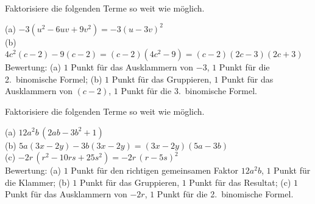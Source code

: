 \documentclass[11pt]{exam}
\begin{document}
\begin{questions}
\noaddpoints
\question[\totalpoints]
\addpoints
Faktorisiere die folgenden Terme so weit wie möglich.
{\begin{solution}
	(a) $-3(u^2-6uv+9v^2)=-3(u-3v)^2$\\
	(b) $4c^2(c-2)-9(c-2)=(c-2)(4c^2-9)=(c-2)(2c-3)(2c+3)$\\
	Bewertung: (a) $1$ Punkt für das Ausklammern von $-3$, $1$ Punkt für die 2.\ binomische Formel; (b) $1$ Punkt für das Gruppieren, $1$ Punkt für das Ausklammern von $(c-2)$, $1$ Punkt für die 3.\ binomische Formel.
\end{solution}}
{}


\noaddpoints
\question[\totalpoints] %
\addpoints
Faktorisiere die folgenden Terme so weit wie möglich.
{\begin{solution}
	(a) $12a^2b\,(2ab-3b^2+1)$\\
	(b) $5a(3x-2y)-3b(3x-2y)=(3x-2y)(5a-3b)$\\
	(c) $-2r\,(r^2-10rs+25s^2)=-2r\,(r-5s)^2$\\
	Bewertung: (a) $1$ Punkt für den richtigen gemeinsamen Faktor $12a^2b$, $1$ Punkt für die Klammer; (b) $1$ Punkt für das Gruppieren, $1$ Punkt für das Resultat; (c) $1$ Punkt für das Ausklammern von $-2r$, $1$ Punkt für die 2.\ binomische Formel.
\end{solution}}
{}


\end{questions}
\end{document}
